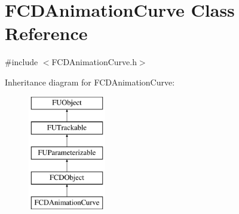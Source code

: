 \hypertarget{classFCDAnimationCurve}{
\section{FCDAnimationCurve Class Reference}
\label{classFCDAnimationCurve}
}


{\ttfamily \#include $<$FCDAnimationCurve.h$>$}

Inheritance diagram for FCDAnimationCurve:\begin{figure}[H]
\begin{center}
\leavevmode
\includegraphics[height=5.000000cm]{classFCDAnimationCurve}
\end{center}
\end{figure}

